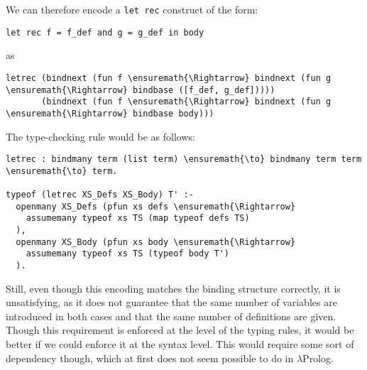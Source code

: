 We can therefore encode a \texttt{let\ rec} construct of the form:

\begin{verbatim}
let rec f = f_def and g = g_def in body
\end{verbatim}

as

\begin{verbatim}
letrec (bindnext (fun f \ensuremath{\Rightarrow} bindnext (fun g \ensuremath{\Rightarrow} bindbase ([f_def, g_def]))))
       (bindnext (fun f \ensuremath{\Rightarrow} bindnext (fun g \ensuremath{\Rightarrow} bindbase body)))
\end{verbatim}

The type-checking rule would be as follows:

\begin{verbatim}
letrec : bindmany term (list term) \ensuremath{\to} bindmany term term \ensuremath{\to} term.

typeof (letrec XS_Defs XS_Body) T' :-
  openmany XS_Defs (pfun xs defs \ensuremath{\Rightarrow}
    assumemany typeof xs TS (map typeof defs TS)
  ),
  openmany XS_Body (pfun xs body \ensuremath{\Rightarrow}
    assumemany typeof xs TS (typeof body T')
  ).
\end{verbatim}

Still, even though this encoding matches the binding structure
correctly, it is unsatisfying, as it does not guarantee that the same
number of variables are introduced in both cases and that the same
number of definitions are given. Though this requirement is enforced at
the level of the typing rules, it would be better if we could enforce it
at the syntax level. This would require some sort of dependency though,
which at first does not seem possible to do in \ensuremath{\lambda}Prolog.
